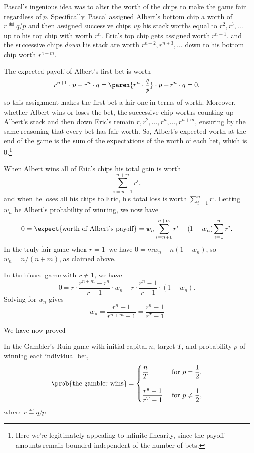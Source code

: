 Pascal's ingenious idea was to alter the worth of the chips to make
the game fair regardless of $p$.  Specifically, Pascal assigned
Albert's bottom chip a worth of $r \eqdef q/p$ and then assigned
successive chips \emph{up} his stack worths equal to
$r^{2},r^{3},\dots$ up to his top chip with worth $r^n$.  Eric's top
chip gets assigned worth $r^{n+1}$, and the successive chips
\emph{down} his stack are worth $r^{n+2},r^{n+3},\dots$ down to
his bottom chip worth $r^{n+m}$.

The expected payoff of Albert's first bet is worth
\[
r^{n+1}\cdot p - r^n\cdot q
   = \paren{r^n \cdot \frac{q}{p}} \cdot p - r^n\cdot q = 0.
\]
so this assignment makes the first bet a fair one in terms of worth.
Moreover, whether Albert wins or loses the bet, the successive chip
worths counting up Albert's stack and then down Eric's remain
$r,r^2,\dots,r^n,\dots,r^{n+m}$, ensuring by the same reasoning that
every bet has fair worth.  So, Albert's expected worth at the end of
the game is the sum of the expectations of the worth of each bet,
which is 0.\footnote{Here we're legitimately appealing to infinite
  linearity, since the payoff amounts remain bounded independent of
  the number of bets.}

When Albert wins all of Eric's chips his total gain is worth
\[
\sum_{i=n+1}^{n+m} r^i,
\]
and when he loses all his chips to Eric, his total loss is worth
$\sum_{i=1}^n r^i$.  Letting $w_n$ be Albert's probability of winning,
we now have
\[
0 = \expect{\text{worth of Albert's payoff}} =
 w_n \sum_{i=n+1}^{n+m} r^i - (1-w_n)\sum_{i=1}^n r^i.
\]
In the truly fair game when $r=1$, we have $0 = mw_n - n(1-w_n)$, so
$w_n = n/(n+m)$, as claimed above.

In the biased game with $r\neq 1$, we have
\[
0 =   r \cdot \frac{r^{n+m} - r^{n}}{r-1} \cdot w_n
        - r \cdot \frac{r^{n}-1}{r-1}\cdot (1-w_n).
\]
Solving for $w_n$ gives
\begin{equation}\label{LN12:wnsol}
w_n = \frac{r^n-1}{r^{n+m} -1} = \frac{r^n-1}{r^{T} -1}
\end{equation}

We have now proved
\begin{theorem}\label{thm:gamblerruin}
  In the Gambler's Ruin game with initial capital $n$, target $T$,
  and probability $p$ of winning each individual bet,
\begin{equation}\label{eq:gamblerruin}
\prob{\text{the gambler wins}} =
\begin{cases}
 \dfrac{n}{T} & \text{ for } p = \dfrac{1}{2},\\
              &   \\
 \dfrac{r^n-1}{r^{T} -1} & \text{ for } p \neq \dfrac{1}{2},
\end{cases}
\end{equation}
where $r \eqdef q/p$.
\end{theorem}

